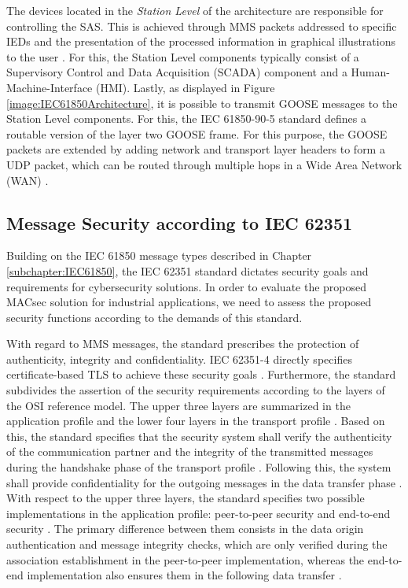 \documentclass[conference, onecolumn, a4paper]{IEEEtran}
\begin{document}
\smallskip
The devices located in the \textit{Station Level} of the architecture are responsible for controlling the SAS. This is achieved through MMS packets addressed 
to specific IEDs and the presentation of the processed information in graphical illustrations to the user \cite{SGRWin_IEC61850Architecture:2021}. 
For this, the Station Level components typically consist of a Supervisory Control and Data Acquisition (SCADA) component and a Human-Machine-Interface 
(HMI). Lastly, as displayed in Figure \ref{image:IEC61850Architecture}, it is possible to transmit GOOSE messages to the Station Level components. 
For this, the IEC 61850-90-5 standard \cite{IEC61850-90-5:2012} defines a routable version of the layer two GOOSE frame. For this purpose, the GOOSE 
packets are extended by adding network and transport layer headers to form a UDP packet, which can be routed through multiple hops in a Wide Area Network (WAN) 
\cite{routable_GOOSE_SV:2020}.

\subsection{Message Security according to IEC 62351}
\noindent Building on the IEC 61850 message types described in Chapter \ref{subchapter:IEC61850}, the IEC 62351 standard \cite{IEC62351:2024} dictates 
security goals and requirements for cybersecurity solutions. In order to evaluate the proposed MACsec solution for industrial applications, 
we need to assess the proposed security functions according to the demands of this standard.

\smallskip
With regard to MMS messages, the standard prescribes the protection of authenticity, integrity and confidentiality. IEC 62351-4 directly specifies 
certificate-based TLS to achieve these security goals \cite{SecureMMS:2020}. Furthermore, the standard subdivides the assertion of the security requirements 
according to the layers of the OSI reference model. The upper three layers are summarized in the application profile and the lower four layers in the 
transport profile \cite{SecureMMS:2020}. Based on this, the standard specifies that the security system shall verify the authenticity of the communication 
partner and the integrity of the transmitted messages during the handshake phase of the transport profile \cite{Review_IEC62351:2019}. Following this, 
the system shall provide confidentiality for the outgoing messages in the data transfer phase \cite{SecureMMS:2020}. With respect to the upper three 
layers, the standard specifies two possible implementations in the application profile: peer-to-peer security and end-to-end security 
\cite{Review_IEC62351:2019}. The primary difference between them consists in the data origin authentication and message integrity checks, which are only 
verified during the association establishment in the peer-to-peer implementation, whereas the end-to-end implementation also ensures them in the following 
data transfer \cite{Review_IEC62351:2019}.
\end{document}
